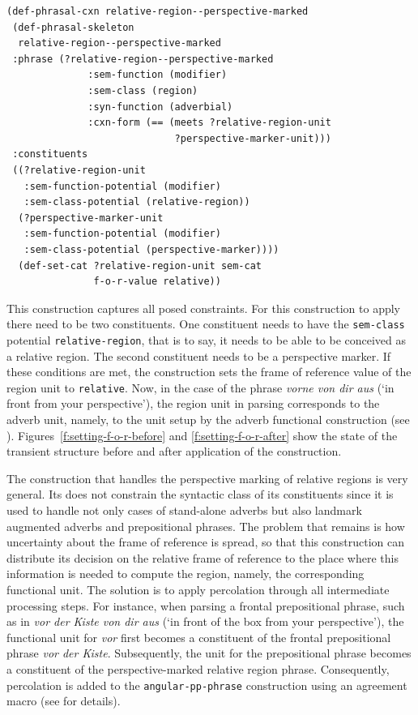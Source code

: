 \ea
\label{e:def-phrasal-relative-region-perspective-marked}
\begin{lstlisting}
(def-phrasal-cxn relative-region--perspective-marked
 (def-phrasal-skeleton 
  relative-region--perspective-marked
 :phrase (?relative-region--perspective-marked
              :sem-function (modifier)
              :sem-class (region)
              :syn-function (adverbial)
              :cxn-form (== (meets ?relative-region-unit 
                             ?perspective-marker-unit)))
 :constituents
 ((?relative-region-unit
   :sem-function-potential (modifier)
   :sem-class-potential (relative-region))
  (?perspective-marker-unit
   :sem-function-potential (modifier)
   :sem-class-potential (perspective-marker))))
  (def-set-cat ?relative-region-unit sem-cat 
               f-o-r-value relative))
\end{lstlisting}
\z

This construction captures all posed constraints. 
For this construction to apply there need to be two constituents. 
One constituent needs to have the {\footnotesize\tt sem-class} potential 
{\footnotesize\tt relative-region}, that is to say, it needs to be
able to be conceived as a relative region. The second constituent needs 
to be a perspective marker. If these conditions are met, 
the construction sets the frame of reference 
value of the region unit to {\footnotesize\tt relative}. Now, in the case of the 
phrase \textit{vorne von dir aus} (`in front from your 
perspective'), the region unit in parsing corresponds to the adverb unit, namely, 
to the unit setup by the adverb functional construction 
(see ). Figures~\ref{f:setting-f-o-r-before} and
\ref{f:setting-f-o-r-after} show the state of the transient structure before and after application of the construction.

The construction that handles the perspective marking of relative regions is very general.
Its does not constrain the syntactic class of its constituents since it is used to
handle not only cases of stand-alone adverbs but also landmark augmented adverbs 
and prepositional phrases. The problem that remains is how uncertainty about 
the frame of reference is spread, so that this construction 
can distribute its decision on the relative frame of reference to the place where
this information is needed to compute the region, namely, the corresponding functional unit. 
The solution is to apply percolation through all intermediate processing steps. 
For instance, when parsing a frontal prepositional phrase,
such as in \textit{vor der Kiste von dir aus} (`in front of the box from your perspective'), the 
functional unit for \textit{vor} first becomes a constituent of the frontal prepositional phrase 
\textit{vor der Kiste}. Subsequently, the unit for the prepositional phrase becomes a constituent of 
the perspective-marked relative region phrase. Consequently, percolation is added
to the {\footnotesize\tt angular-pp-phrase} construction using an 
agreement macro (see \citealp{steels2011phrasal,steels2011design} for details).

